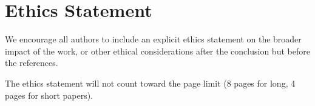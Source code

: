 \section{Ethics Statement}

We encourage all authors to include an explicit ethics statement on the broader impact of the work, or other ethical considerations after the conclusion but before the references. 

The ethics statement will not count toward the page limit (8 pages for long, 4 pages for short papers).